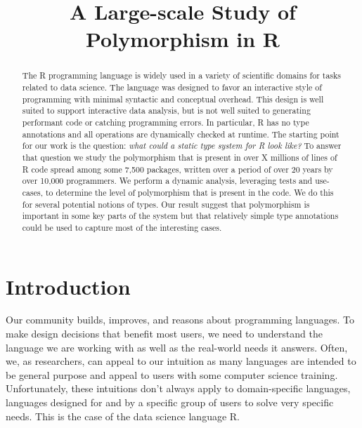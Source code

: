 \documentclass[acmsmall,10pt,review,anonymous]{acmart}\settopmatter{printfolios=true,printccs=false,printacmref=false}
\begin{document}
\title{A Large-scale Study of Polymorphism in R}

\newcommand{\PACKAGES}{7,500\xspace}
\newcommand{\PROGRAMMERS}{10,000\xspace}

\begin{abstract}
The R programming language is widely used in a variety of scientific domains
for tasks related to data science. The language was designed to favor an
interactive style of programming with minimal syntactic and conceptual
overhead. This design is well suited to support interactive data analysis,
but is not well suited to generating performant code or catching programming
errors.  In particular, R has no type annotations and all operations are
dynamically checked at runtime. The starting point for our work is the
question: \emph{what could a static type system for R look like?}  To answer
that question we study the polymorphism that is present in over X millions
of lines of R code spread among some \PACKAGES packages, written over a
period of over 20 years by over 10,000 programmers.  We perform a dynamic
analysis, leveraging tests and use-cases, to determine the level of
polymorphism that is present in the code. We do this for several potential
notions of types. Our result suggest that polymorphism is important in some
key parts of the system but that relatively simple type annotations could be
used to capture most of the interesting cases.
\end{abstract}

\maketitle

\section{Introduction}

Our community builds, improves, and reasons about programming languages.  To
make design decisions that benefit most users, we need to understand the
language we are working with as well as the real-world needs it
answers. Often, we, as researchers, can appeal to our intuition as many
languages are intended to be general purpose and appeal to users with some
computer science training. Unfortunately, these intuitions don't always
apply to domain-specific languages, languages designed for and by a specific
group of users to solve very specific needs. This is the case of the data
science language R.
\end{document}
